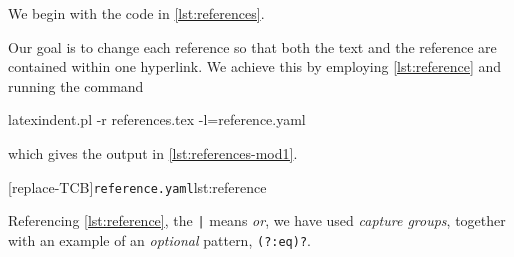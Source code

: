 \documentclass[10pt]{article}
\begin{document}
 \begin{example}
 We begin with the code in \cref{lst:references}.


 Our goal is to change each reference so that both the text and the reference are
 contained within one hyperlink. We achieve this by employing \cref{lst:reference} and
 running the command  

 \begin{commandshell}
latexindent.pl -r references.tex -l=reference.yaml
\end{commandshell}

 which gives the output in \cref{lst:references-mod1}. 


 [replace-TCB]{\texttt{reference.yaml}}{lst:reference}

 Referencing \cref{lst:reference}, the \lstinline!|! means \emph{or}, we have used
 \emph{capture groups}, together with an example of an \emph{optional} pattern,
 \lstinline!(?:eq)?!.
 \end{example}
\end{document}
